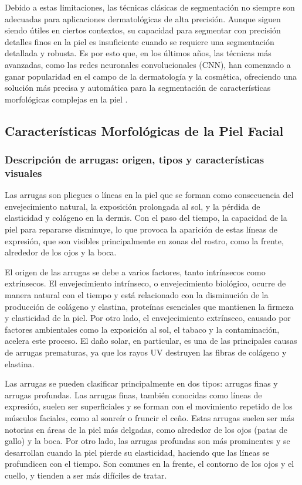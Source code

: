 Debido a estas limitaciones, las técnicas clásicas de segmentación no siempre son adecuadas para aplicaciones dermatológicas de alta precisión. Aunque siguen siendo útiles en ciertos contextos, su capacidad para segmentar con precisión detalles finos en la piel es insuficiente cuando se requiere una segmentación detallada y robusta. Es por esto que, en los últimos años, las técnicas más avanzadas, como las redes neuronales convolucionales (CNN), han comenzado a ganar popularidad en el campo de la dermatología y la cosmética, ofreciendo una solución más precisa y automática para la segmentación de características morfológicas complejas en la piel \parencite{yoo2020}.

\subsection{Características Morfológicas de la Piel Facial}

\subsubsection{Descripción de arrugas: origen, tipos y características visuales}
Las arrugas son pliegues o líneas en la piel que se forman como consecuencia del envejecimiento natural, la exposición prolongada al sol, y la pérdida de elasticidad y colágeno en la dermis. Con el paso del tiempo, la capacidad de la piel para repararse disminuye, lo que provoca la aparición de estas líneas de expresión, que son visibles principalmente en zonas del rostro, como la frente, alrededor de los ojos y la boca. 

El origen de las arrugas se debe a varios factores, tanto intrínsecos como extrínsecos. El envejecimiento intrínseco, o envejecimiento biológico, ocurre de manera natural con el tiempo y está relacionado con la disminución de la producción de colágeno y elastina, proteínas esenciales que mantienen la firmeza y elasticidad de la piel. Por otro lado, el envejecimiento extrínseco, causado por factores ambientales como la exposición al sol, el tabaco y la contaminación, acelera este proceso. El daño solar, en particular, es una de las principales causas de arrugas prematuras, ya que los rayos UV destruyen las fibras de colágeno y elastina.

Las arrugas se pueden clasificar principalmente en dos tipos: arrugas finas y arrugas profundas. Las arrugas finas, también conocidas como líneas de expresión, suelen ser superficiales y se forman con el movimiento repetido de los músculos faciales, como al sonreír o fruncir el ceño. Estas arrugas suelen ser más notorias en áreas de la piel más delgadas, como alrededor de los ojos (patas de gallo) y la boca. Por otro lado, las arrugas profundas son más prominentes y se desarrollan cuando la piel pierde su elasticidad, haciendo que las líneas se profundicen con el tiempo. Son comunes en la frente, el contorno de los ojos y el cuello, y tienden a ser más difíciles de tratar.

